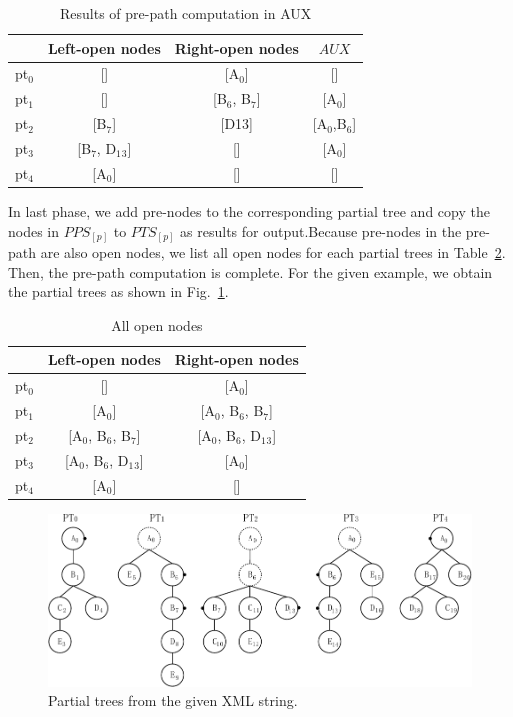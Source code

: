 \begin{table}[t]
	\caption{Results of pre-path computation in AUX}
	\label{table:tempresult}
	\centering
	\begin{tabular}{c|ccc}
		\hline
		& Left-open nodes	& Right-open nodes & $AUX$\\
		\hline
		pt$_0$	& []			& [A$_0$]  & []\\  
		pt$_1$	& []			& [B$_6$, B$_7$] & [A$_0$] \\
		pt$_2$	& [B$_7$]			& [D13] &[A$_0$,B$_6$]\\
		pt$_3$	& [B$_7$, D$_1$$_3$]		& []  & [A$_0$]\\
		pt$_4$	& [A$_0$]			& [] &[]\\
		\hline
	\end{tabular}
\end{table}


In last phase, we add pre-nodes to the corresponding partial tree and copy the nodes in $PPS_{[p]}$ to $PTS_{[p]}$ as results for output.Because pre-nodes in the pre-path are also open nodes, we list all open nodes for each partial trees in Table~\ref{table:allopennodes}. Then, the pre-path computation is complete. For the given example, we obtain the partial trees as shown in Fig.~\ref{fig:partialtree2}.

\begin{table}[t]
	\caption{All open nodes}
	\label{table:allopennodes}
	\centering
	\begin{tabular}{c|cc}
	\hline
	& Left-open nodes	& Right-open nodes \\
	\hline
	pt$_0$	& []						& [A$_0$] \\
	pt$_1$	& [A$_0$]					& [A$_0$, B$_6$, B$_7$] \\
	pt$_2$	& [A$_0$, B$_6$, B$_7$]		& [A$_0$, B$_6$, D$_1$$_3$] \\
	pt$_3$	& [A$_0$, B$_6$, D$_1$$_3$]	& [A$_0$] \\
	pt$_4$	& [A$_0$]					& [] \\
	\hline
	\end{tabular}
\end{table} 


\begin{figure}[t]
	\centering\includegraphics[]{partialtree/figures/fromWord-7.pdf}
	\caption{Partial trees from the given XML string.}
	\label{fig:partialtree2}
\end{figure}

